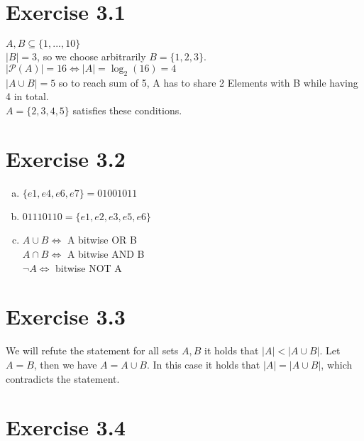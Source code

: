 \documentclass{article} %
\newcommand{\homeworkNumber}{3}
\begin{document}
\section*{Exercise \homeworkNumber.1}
$A,B \subseteq \{1,...,10\}$ \\
$\lvert B \lvert = 3$, so we choose arbitrarily $B = \{1,2,3\}$. \\
$\lvert \mathcal P(A) \lvert = 16  \iff \lvert A \lvert = \log_2(16) = 4$ \\
$\lvert A \cup B \lvert = 5$ so to reach sum of 5, A has to share 2 Elements with B while having 4 in total.\\
$A = \{2,3,4,5\}$ satisfies these conditions.




\section*{Exercise \homeworkNumber.2}

\begin{enumerate}[(a)]
	\item $\{e1,e4,e6,e7\} = 01001011$
	\item $01110110 = \{e1,e2,e3,e5,e6\}$
	\item
	      $A \cup B \iff $ A bitwise OR B\\
	      $A \cap B \iff $ A bitwise AND B\\
	      $ \lnot A \iff $ bitwise NOT A\\


\end{enumerate}



\section*{Exercise \homeworkNumber.3}
We will refute the statement for all sets \( A,B \) it holds that \( |A| < |A \cup B| \). Let \( A = B \), then we have \( A = A \cup B \). In this case it holds that \( |A| = |A \cup B| \), which contradicts the statement.



\section*{Exercise \homeworkNumber.4}
\end{document}
